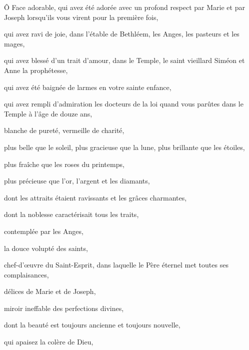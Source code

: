\documentclass{bibliotheca-missel}
\begin{document}
\begin{litanie}
\item Ô Face adorable, qui avez été adorée avec un profond respect par Marie et par Joseph lorsqu’ils vous virent pour la première fois,
\item qui avez ravi de joie, dans l’étable de Bethléem, les Anges, les pasteurs et les mages,
\item qui avez blessé d’un trait d’amour, dans le Temple, le saint vieillard Siméon et Anne la prophétesse,
\item qui avez été baignée de larmes en votre sainte enfance,
\item qui avez rempli d’admiration les docteurs de la loi quand vous parûtes dans le Temple à l’âge de douze ans,
\item blanche de pureté, vermeille de charité,
\item plus belle que le soleil, plus gracieuse que la lune, plus brillante que les étoiles,
\item plus fraîche que les roses du printemps,
\item plus précieuse que l’or, l’argent et les diamants,
\item dont les attraits étaient ravissants et les grâces charmantes,
\item dont la noblesse caractérisait tous les traits,
\item contemplée par les Anges,
\item la douce volupté des saints,
\item chef-d’œuvre du Saint-Esprit, dans laquelle le Père éternel met toutes ses complaisances,
\item délices de Marie et de Joseph,
\item miroir ineffable des perfections divines,
\item dont la beauté est toujours ancienne et toujours nouvelle,
\item qui apaisez la colère de Dieu,

\end{litanie}
\end{document}
